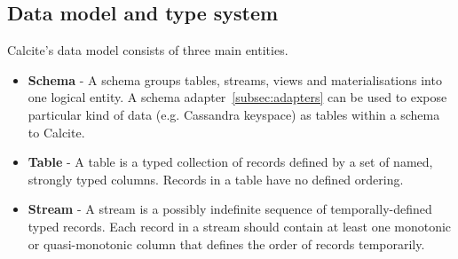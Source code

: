 \subsection{Data model and type system}
\label{subsec:dm-ts}
Calcite's data model consists of three main entities.

\begin{itemize}
  \item \textbf{Schema} - A schema groups tables, streams, views and materialisations into one logical entity. A schema adapter~\ref{subsec:adapters} can be used to expose particular kind of data (e.g. Cassandra keyspace) as tables within a schema to Calcite.
  \item \textbf{Table} - A table is a typed collection of records defined by a set of named, strongly typed columns. Records in a table have no defined ordering.
  \item \textbf{Stream} - A stream is a possibly indefinite sequence of temporally-defined typed records. Each record in a stream should contain at least one monotonic or quasi-monotonic column that defines the order of records temporarily.
\end{itemize}


